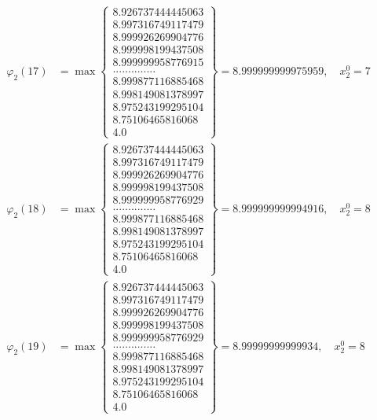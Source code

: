\documentclass{article}
\begin{document}
\begin{align*}
  
  
  
\varphi_{2}(17) &= \max \left\{ \begin{array}{c}
8.926737444445063 \\
 8.997316749117479 \\
 8.999926269904776 \\
 8.999998199437508 \\
 8.999999958776915 \\
 .............. \\
 8.999877116885468 \\
 8.998149081378997 \\
 8.975243199295104 \\
 8.75106465816068 \\
 4.0
\end{array} \right\} = 8.999999999975959, \quad x_{2}^0 = 7\\
  
  
  
  
\varphi_{2}(18) &= \max \left\{ \begin{array}{c}
8.926737444445063 \\
 8.997316749117479 \\
 8.999926269904776 \\
 8.999998199437508 \\
 8.999999958776929 \\
 .............. \\
 8.999877116885468 \\
 8.998149081378997 \\
 8.975243199295104 \\
 8.75106465816068 \\
 4.0
\end{array} \right\} = 8.999999999994916, \quad x_{2}^0 = 8\\
  
  
  
  
\varphi_{2}(19) &= \max \left\{ \begin{array}{c}
8.926737444445063 \\
 8.997316749117479 \\
 8.999926269904776 \\
 8.999998199437508 \\
 8.999999958776929 \\
 .............. \\
 8.999877116885468 \\
 8.998149081378997 \\
 8.975243199295104 \\
 8.75106465816068 \\
 4.0
\end{array} \right\} = 8.99999999999934, \quad x_{2}^0 = 8\\
  

\end{align*}
\end{document}
